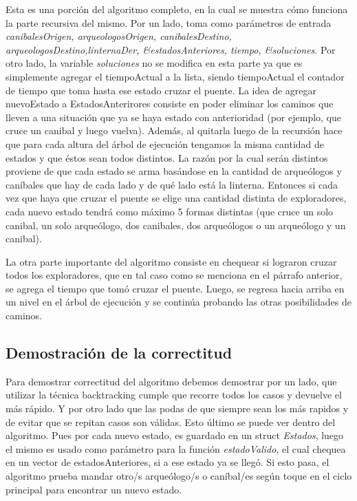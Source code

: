             Esta es una porción del algoritmo completo, en la cual se muestra cómo funciona la parte recursiva del mismo. Por un lado, toma como parámetros de entrada \emph{canibalesOrigen, arqueologosOrigen, canibalesDestino, arqueologosDestino,linternaDer, &estadosAnteriores, tiempo, &soluciones}. Por otro lado, la variable \emph{soluciones} no se modifica en esta parte ya que es simplemente agregar el tiempoActual a la lista, siendo tiempoActual el contador de tiempo que toma hasta ese estado cruzar el puente. La idea de agregar nuevoEstado a EstadosAnterirores consiste en poder eliminar los caminos que lleven a una situación que ya se haya estado con anterioridad (por ejemplo, que cruce un canibal y luego vuelva). Además, al quitarla luego de la recursión hace que para cada altura del árbol de ejecución tengamos la misma cantidad de estados y que éstos sean todos distintos. La razón por la cual serán distintos proviene de que cada estado se arma basándose en la cantidad de arqueólogos y caníbales que hay de cada lado y de qué lado está la linterna. Entonces si cada vez que haya que cruzar el puente se elige una cantidad distinta de exploradores, cada nuevo estado tendrá como máximo 5 formas distintas (que cruce un solo canibal, un solo arqueólogo, dos canibales, dos arqueólogos o un arqueólogo y un canibal).

            La otra parte importante del algoritmo consiste en chequear si lograron cruzar todos los exploradores, que en tal caso como se menciona en el párrafo anterior, se agrega el tiempo que tomó cruzar el puente. Luego, se regresa hacia arriba en un nivel en el árbol de ejecución y se continúa probando las otras posibilidades de caminos.




    \subsection{Demostración de la correctitud}
      Para demostrar correctitud del algoritmo debemos demostrar por un lado, que utilizar la técnica backtracking cumple que recorre todos los casos y devuelve el más rápido. Y por otro lado que las podas de que siempre sean los más rapidos y de evitar que se repitan casos son válidas.
      Esto último se puede ver dentro del algoritmo. Pues por cada nuevo estado, es guardado en un struct \emph{Estados}, luego el mismo es usado como parámetro para la función \emph{estadoValido}, el cual chequea en un vector de estadosAnteriores, si a ese estado ya se llegó. Si esto pasa, el algoritmo prueba mandar otro/s arqueólogo/s o caníbal/es según toque en el ciclo principal para encontrar un nuevo estado.\par

